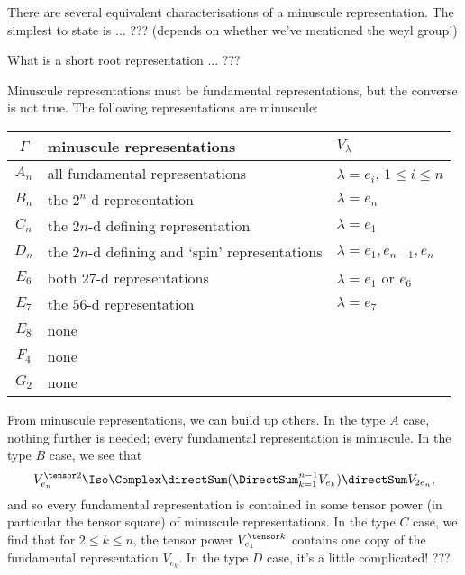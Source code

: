 There are several equivalent characterisations of a minuscule
representation. The simplest to state is ... ??? (depends on whether
we've mentioned the weyl group!)

What is a short root representation ... ??? \cite[\S 5A]{jantzen}

Minuscule representations must be fundamental representations, but the converse is not true. The
following representations are minuscule:
\begin{center}
\begin{tabular}{c|l|l}
 $\Gamma$ & minuscule representations & $V_\lambda$ \\
 \hline%
 $A_n$ & all fundamental representations & $\lambda = e_i$, $1 \leq i \leq n$ \\
 $B_n$ & the $2^n$-d representation      & $\lambda = e_n$ \\
 $C_n$ & the $2n$-d defining representation             & $\lambda = e_1$ \\
 $D_n$ & the $2n$-d defining and `spin' representations & $\lambda = e_1, e_{n-1}, e_{n}$ \\
 $E_6$ & both $27$-d representations                    & $\lambda = e_1$ or $e_6$ \\
 $E_7$ & the $56$-d representation                      & $\lambda = e_7$ \\
 $E_8$ & none                             & \\
 $F_4$ & none & \\
 $G_2$ & none &
\end{tabular}
\end{center}


From minuscule representations, we can build up others. In the type $A$ case, nothing further is needed; every fundamental
representation is minuscule. In the type $B$ case, we see that
$$V_{e_n}^{\tensor 2} \Iso \Complex \directSum (\DirectSum_{k=1}^{n-1} V_{e_k}) \directSum V_{2e_n},$$
and so every fundamental representation is contained in some tensor power (in particular the tensor square) of minuscule representations.
In the type $C$ case, we find that for $2 \leq k \leq n$, the tensor power $V_{e_1}^{\tensor k}$ contains one copy of the fundamental representation
$V_{e_k}$.
In the type $D$ case, it's a little complicated! ???

